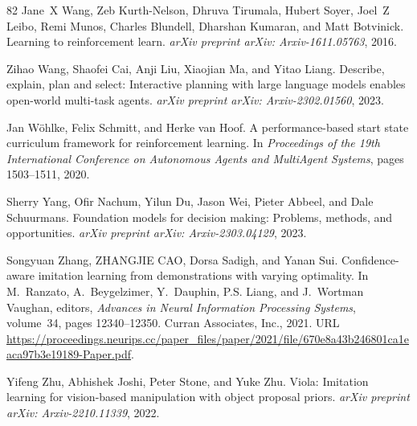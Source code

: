 \documentclass{article}
\begin{document}
\begin{thebibliography}{82}
Jane~X Wang, Zeb Kurth-Nelson, Dhruva Tirumala, Hubert Soyer, Joel~Z Leibo, Remi Munos, Charles Blundell, Dharshan Kumaran, and Matt Botvinick.
\newblock Learning to reinforcement learn.
\newblock \emph{arXiv preprint arXiv: Arxiv-1611.05763}, 2016.

Zihao Wang, Shaofei Cai, Anji Liu, Xiaojian Ma, and Yitao Liang.
\newblock Describe, explain, plan and select: Interactive planning with large language models enables open-world multi-task agents.
\newblock \emph{arXiv preprint arXiv: Arxiv-2302.01560}, 2023{}.

Jan W{\"o}hlke, Felix Schmitt, and Herke van Hoof.
\newblock A performance-based start state curriculum framework for reinforcement learning.
\newblock In \emph{Proceedings of the 19th International Conference on Autonomous Agents and MultiAgent Systems}, pages 1503--1511, 2020.

Sherry Yang, Ofir Nachum, Yilun Du, Jason Wei, Pieter Abbeel, and Dale Schuurmans.
\newblock Foundation models for decision making: Problems, methods, and opportunities.
\newblock \emph{arXiv preprint arXiv: Arxiv-2303.04129}, 2023.

Songyuan Zhang, ZHANGJIE CAO, Dorsa Sadigh, and Yanan Sui.
\newblock Confidence-aware imitation learning from demonstrations with varying optimality.
\newblock In M.~Ranzato, A.~Beygelzimer, Y.~Dauphin, P.S. Liang, and J.~Wortman Vaughan, editors, \emph{Advances in Neural Information Processing Systems}, volume~34, pages 12340--12350. Curran Associates, Inc., 2021.
\newblock URL \url{https://proceedings.neurips.cc/paper_files/paper/2021/file/670e8a43b246801ca1eaca97b3e19189-Paper.pdf}.

Yifeng Zhu, Abhishek Joshi, Peter Stone, and Yuke Zhu.
\newblock Viola: Imitation learning for vision-based manipulation with object proposal priors.
\newblock \emph{arXiv preprint arXiv: Arxiv-2210.11339}, 2022.

\end{thebibliography}


\newpage
\appendix

\end{document}
